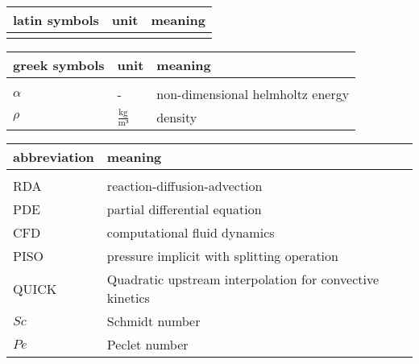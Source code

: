 \documentclass[../thesis.tex]{subfiles}
\begin{document}
	

\renewcommand*{\arraystretch}{1.2}
\small
\begin{tabular}{p{4cm}p{3cm}p{8cm}}
	latin symbols & unit & meaning \\ 
	\hline \\[\dimexpr-\normalbaselineskip+2pt]
	
\end{tabular}
\vspace{1cm}

\small
\begin{tabular}{p{4cm}p{3cm}p{8cm}}
	greek symbols & unit & meaning \\
	\hline \\[\dimexpr-\normalbaselineskip+2pt] 
	$\alpha$ & - & non-dimensional helmholtz energy \\
	$\rho$ & $\frac{\text{kg}}{\text{m³}}$ & density \\
\end{tabular}

\small
\begin{tabular}{p{4cm}p{8cm}}
	abbreviation & meaning \\
	\hline \\[\dimexpr-\normalbaselineskip+2pt] 
	RDA & reaction-diffusion-advection \\
	PDE & partial differential equation \\
	CFD & computational fluid dynamics \\
	PISO & pressure implicit with splitting operation \\
	QUICK & Quadratic upstream interpolation for convective kinetics\\
	$Sc$ & Schmidt number \\
	$Pe$ & Peclet number \\
\end{tabular}

\listoffigures
\listoftables
\end{document}
